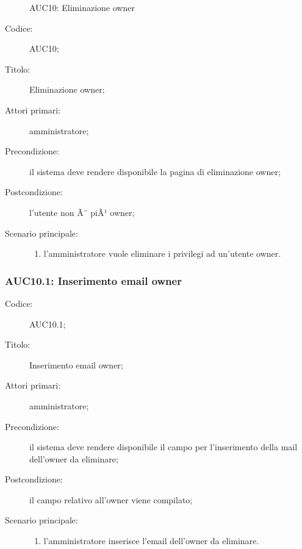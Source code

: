 \documentclass[../../../analisi-dei-requisiti.tex]{subfiles}
\begin{document}
\begin{figure}[H]
  \centering
  \caption{AUC10: Eliminazione owner}%
  \label{fig:AUC10}
\end{figure}

\begin{description}
  \item[Codice:] AUC10;
  \item[Titolo:] Eliminazione owner;
  \item[Attori primari:] amministratore;
  \item[Precondizione:] il sistema deve rendere disponibile la pagina di eliminazione owner;
  \item[Postcondizione:] l'utente non Ã¨ piÃ¹ owner;
  \item[Scenario principale:]
  \begin{enumerate}
    \item l'amministratore vuole eliminare i privilegi ad un'utente owner.
  \end{enumerate}
\end{description}

\subsubsection{AUC10.1: Inserimento email owner}%
\label{subs:AUC10.1}
\begin{description}
  \item[Codice:] AUC10.1;
  \item[Titolo:] Inserimento email owner;
  \item[Attori primari:] amministratore;
  \item[Precondizione:] il sistema deve rendere disponibile il campo per l'inserimento della mail dell'owner da eliminare;
  \item[Postcondizione:] il campo relativo all'owner viene compilato;
  \item[Scenario principale:]
  \begin{enumerate}
    \item l'amministratore inserisce l'email dell'owner da eliminare.
  \end{enumerate}
\end{description}
\end{document}
